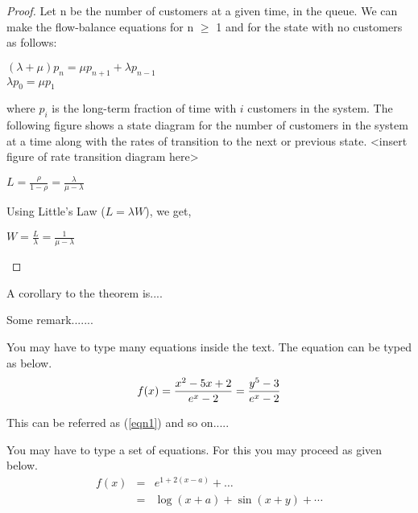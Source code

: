 \begin{proof}
Let n be the number of customers at a given time, in the queue. We can make the flow-balance equations for n $\ge$ 1 and for the state with no customers as follows:
\begin{center}
$(\lambda + \mu)p_n = \mu p_{n+1} + \lambda p_{n-1}$ \\
$\lambda p_0 = \mu p_1$ \\
\end{center}
where $p_i$ is the long-term fraction of time with $i$ customers in the system. The following figure shows a state diagram for the number of customers in the system at a time along with the rates of transition to the next or previous state.
<insert figure of rate transition diagram here>

\begin{center}
$L = \frac{\rho}{1-\rho} = \frac{\lambda}{\mu - \lambda}$
\end{center}
Using Little's Law ($L = \lambda W$), we get,
\begin{center}
	 $W = \frac{L}{\lambda} = \frac{1}{\mu - \lambda}$
\end{center}
\end{proof}
\vspace{20mm}

\begin{corollary}
A corollary to the theorem is....
\end{corollary}

\begin{remark}
Some remark.......
\end{remark}


You may have to type many equations inside the text.  The equation can be typed as below.
\begin{equation}\label{eqn1}
f(x) = \frac{x^2-5x+2}{e^x - 2} = {y^5-3 \over e^x-2} %
\end{equation}

This can be referred as (\ref{eqn1}) and so on.....

You may have to type a set of equations.  For this you may proceed as given below.
\begin{eqnarray}
f(x) &=& e^{1+2(x-a)} + \ldots   \nonumber   \\
  &=& \log(x+a) + \sin(x+y) + \cdots  \label{eqn2}
\end{eqnarray}



